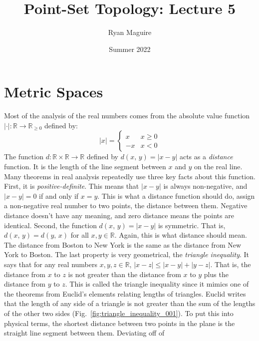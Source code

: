 \documentclass{article}
\title{Point-Set Topology: Lecture 5}
\author{Ryan Maguire}
\date{Summer 2022}
\theoremstyle{plain}
\theoremstyle{normal}
\begin{document}
    \maketitle
    \section{Metric Spaces}
        Most of the analysis of the real numbers comes from the absolute value
        function $|\cdot|:\mathbb{R}\rightarrow\mathbb{R}_{\geq{0}}$ defined
        by:
        \begin{equation}
            |x|=
            \begin{cases}
                x&x\geq{0}\\
                -x&x<0
            \end{cases}
        \end{equation}
        The function $d:\mathbb{R}\times\mathbb{R}\rightarrow\mathbb{R}$
        defined by $d(x,\,y)=|x-y|$ acts as a \textit{distance} function. It is
        the length of the line segment between $x$ and $y$ on the real line.
        Many theorems in real analysis repeatedly use three key facts about this
        function. First, it is \textit{positive-definite}. This means that
        $|x-y|$ is always non-negative, and $|x-y|=0$ if and only if $x=y$.
        This is what a distance function should do, assign a non-negative
        real number to two points, the distance between them. Negative distance
        doesn't have any meaning, and zero distance means the points are
        identical. Second, the function $d(x,\,y)=|x-y|$ is symmetric. That is,
        $d(x,\,y)=d(y,\,x)$ for all $x,y\in\mathbb{R}$. Again, this is what
        distance should mean. The distance from Boston to New York is the same
        as the distance from New York to Boston. The last property is very
        geometrical, the \textit{triangle inequality}. It says that for any
        real numbers $x,y,z\in\mathbb{R}$, $|x-z|\leq|x-y|+|y-z|$. That is,
        the distance from $x$ to $z$ is not greater than the distance from
        $x$ to $y$ plus the distance from $y$ to $z$. This is called the
        triangle inequality since it mimics one of the theorems from Euclid's
        elements relating lengths of triangles. Euclid writes that the length
        of any side of a triangle is not greater than the sum of the lengths of
        the other two sides (Fig.~\ref{fig:triangle_inequality_001}). To put
        this into physical terms, the shortest distance between two points in
        the plane is the straight line segment between them. Deviating off of
\end{document}
